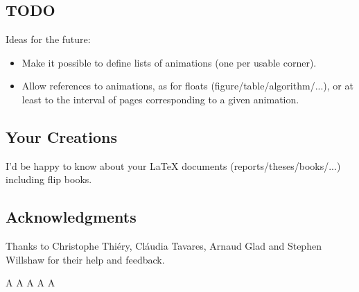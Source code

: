 \documentclass[a4paper,twoside]{article}
\begin{document}
\subsection{TODO}

Ideas for the future:
\begin{itemize}
\item Make it possible to define lists of animations (one per usable corner).
\item Allow references to animations, as for floats
  (figure/table/algorithm/...), or at least to the interval of pages
  corresponding to a given animation.
\end{itemize}

\subsection{Your Creations}

I'd be happy to know about your \LaTeX{} documents
(reports/theses/books/...) including flip books. 

\subsection{Acknowledgments}

Thanks to Christophe Thiéry, Cláudia Tavares, Arnaud Glad and Stephen
Willshaw for their help and feedback.

\newpage
A
\newpage
A
\newpage
A
\newpage
A
\newpage
A
\end{document}
